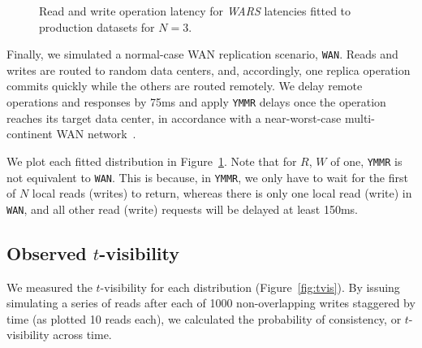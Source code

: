\documentclass{vldb}
\begin{document}
\begin{figure}
\caption{Read and write operation latency for \textit{WARS} latencies fitted
  to production datasets for $N$$=$$3$.}
\label{fig:latencies}
\end{figure}

Finally, we simulated a normal-case WAN replication scenario,
\texttt{WAN}.  Reads and writes are routed to random data centers,
and, accordingly, one replica operation commits quickly while the
others are routed remotely.  We delay remote operations and responses
by 75ms and apply \texttt{YMMR} delays once the operation reaches its
target data center, in accordance with a near-worst-case
multi-continent WAN network~\cite{dean-keynote}.

We plot each fitted distribution in Figure~\ref{fig:latencies}.  Note
that for $R$, $W$ of one, \texttt{YMMR} is not equivalent to
\texttt{WAN}.  This is because, in \texttt{YMMR}, we only have to wait
for the first of $N$ local reads (writes) to return, whereas there is
only one local read (write) in \texttt{WAN}, and all other read
(write) requests will be delayed at least 150ms.

\subsection{Observed $t$-visibility}

We measured the $t$-visibility for each distribution
(Figure~\ref{fig:tvis}).  By issuing simulating a series of reads
after each of 1000 non-overlapping writes staggered by time (as
plotted 10 reads each), we calculated the probability of consistency,
or $t$-visibility across time.
\end{document}
